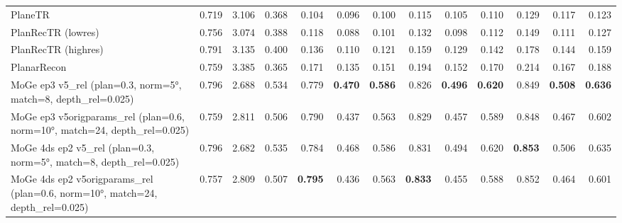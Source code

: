 \begin{table}[H]
{\begin{tabular}{l r r r r r r r r r r r r}
PlaneTR & 0.719 & 3.106 & 0.368 & 0.104 & 0.096 & 0.100 & 0.115 & 0.105 & 0.110 & 0.129 & 0.117 & 0.123 \\
PlanRecTR (lowres) & 0.756 & 3.074 & 0.388 & 0.118 & 0.088 & 0.101 & 0.132 & 0.098 & 0.112 & 0.149 & 0.111 & 0.127 \\
PlanRecTR (highres) & 0.791 & 3.135 & 0.400 & 0.136 & 0.110 & 0.121 & 0.159 & 0.129 & 0.142 & 0.178 & 0.144 & 0.159 \\
PlanarRecon & 0.759 & 3.385 & 0.365 & 0.171 & 0.135 & 0.151 & 0.194 & 0.152 & 0.170 & 0.214 & 0.167 & 0.188 \\
MoGe ep3 v5\_rel (plan=0.3, norm=5°, match=8, depth\_rel=0.025) & 0.796 & 2.688 & 0.534 & 0.779 & \textbf{0.470} & \textbf{0.586} & 0.826 & \textbf{0.496} & \textbf{0.620} & 0.849 & \textbf{0.508} & \textbf{0.636} \\
MoGe ep3 v5origparams\_rel (plan=0.6, norm=10°, match=24, depth\_rel=0.025) & 0.759 & 2.811 & 0.506 & 0.790 & 0.437 & 0.563 & 0.829 & 0.457 & 0.589 & 0.848 & 0.467 & 0.602 \\
MoGe 4ds ep2 v5\_rel (plan=0.3, norm=5°, match=8, depth\_rel=0.025) & 0.796 & 2.682 & 0.535 & 0.784 & 0.468 & 0.586 & 0.831 & 0.494 & 0.620 & \textbf{0.853} & 0.506 & 0.635 \\
MoGe 4ds ep2 v5origparams\_rel (plan=0.6, norm=10°, match=24, depth\_rel=0.025) & 0.757 & 2.809 & 0.507 & \textbf{0.795} & 0.436 & 0.563 & \textbf{0.833} & 0.455 & 0.588 & 0.852 & 0.464 & 0.601 \\
\bottomrule
\end{tabular}%
}
\end{table}